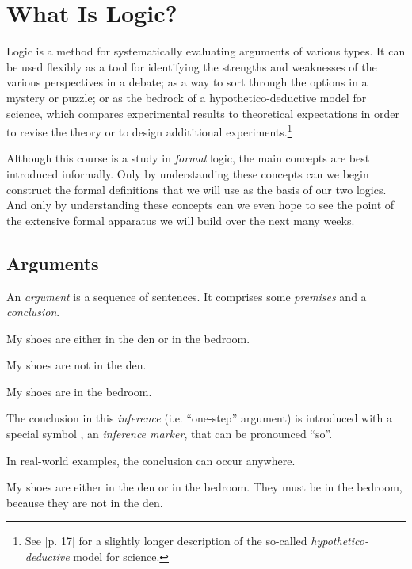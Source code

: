\section{What Is Logic?}

Logic is a method for systematically evaluating arguments of various
types. It can be used flexibly as a tool for identifying the strengths
and weaknesses of the various perspectives in a debate; as a way to sort through
the options in a mystery or puzzle; or as the bedrock of a hypothetico-deductive
model for science, which compares experimental results to theoretical
expectations in order to revise the theory or to design addititional
experiments.\footnote{See \cite{Smi20}[p. 17] for a slightly longer description
of the so-called \emph{hypothetico-deductive} model for science.}

Although this course is a study in \emph{formal} logic, the main concepts are
best introduced informally. Only by understanding these concepts can we begin
construct the formal definitions that we will use as the basis of our two
logics. And only by understanding these concepts can we even hope to see the
point of the extensive formal apparatus we will build over the next many weeks.

\subsection{Arguments}

An \emph{argument} is a sequence of sentences. It comprises some \emph{premises}
and a \emph{conclusion}.

\begin{argument}
\item[] My shoes are either in the den or in the bedroom.
\item[] My shoes are not in the den.
\item[\therefore] My shoes are in the bedroom.
\end{argument}

The conclusion in this \emph{inference} (i.e. ``one-step'' argument) is
introduced with a special symbol \therefore, an \emph{inference marker},
that can be pronounced ``so''.

In real-world examples, the conclusion can occur anywhere.

\begin{argument}
\item[] My shoes are either in the den or in the bedroom. They must be in
  the bedroom, because they are not in the den.
\end{argument}

